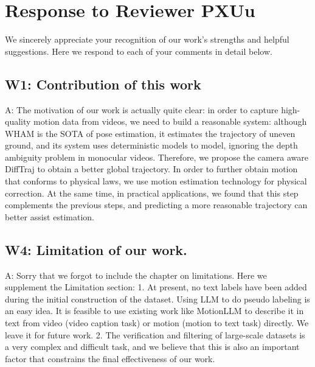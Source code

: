 \documentclass{article}
\begin{document}



\section{Response to Reviewer PXUu}\label{response-to-reviewer-pxuu}

We sincerely appreciate your recognition of our work's strengths and helpful suggestions. Here we respond to each of your comments in detail below.

\subsection{W1: Contribution of this work}\label{w1-contribution-of-this-work}

A: The motivation of our work is actually quite clear: in order to capture high-quality motion data from videos, we need to build a reasonable system: although WHAM is the SOTA of pose estimation, it estimates the trajectory of uneven ground, and its system uses deterministic models to model, ignoring the depth ambiguity problem in monocular videos. Therefore, we propose the camera aware DiffTraj to obtain a better global trajectory. In order to further obtain motion that conforms to physical laws, we use motion estimation technology for physical correction. At the same time, in practical applications, we found that this step complements the previous steps, and predicting a more reasonable trajectory can better assist estimation.

\subsection{W4: Limitation of our work.}\label{w4-limitation-of-our-work.}

A: Sorry that we forgot to include the chapter on limitations. Here we supplement the Limitation section: 1. At present, no text labels have been added during the initial construction of the dataset. Using LLM to do pseudo labeling is an easy idea. It is feasible to use existing work like MotionLLM to describe it in text from video (video caption task) or motion (motion to text task) directly. We leave it for future work. 2. The verification and filtering of large-scale datasets is a very complex and difficult task, and we believe that this is also an important factor that constrains the final effectiveness of our work.
\end{document}

